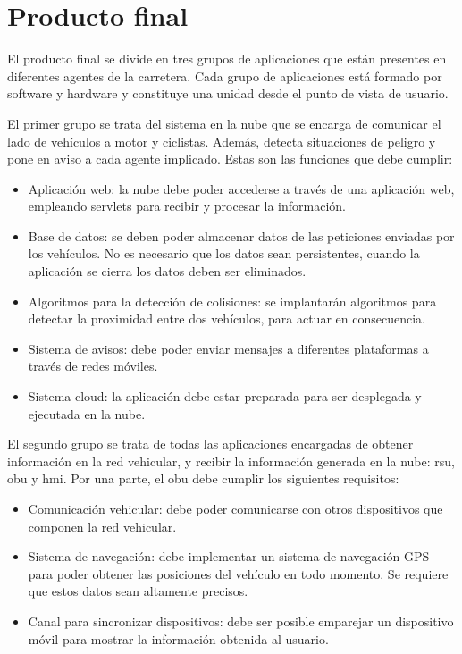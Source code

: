 \chapter{Producto final}
El producto final se divide en tres grupos de aplicaciones que están presentes en diferentes agentes de la carretera. Cada grupo de aplicaciones está formado por software y hardware y constituye una unidad desde el punto de vista de usuario.

El primer grupo se trata del sistema en la nube que se encarga de comunicar el lado de vehículos a motor y ciclistas. Además, detecta situaciones de peligro y pone en aviso a cada agente implicado. Estas son las funciones que debe cumplir:
\begin{itemize}
	\item Aplicación web: la nube debe poder accederse a través de una aplicación web, empleando servlets para recibir y procesar la información.
	
	\item Base de datos: se deben poder almacenar datos de las peticiones enviadas por los vehículos. No es necesario que los datos sean persistentes, cuando la aplicación	se cierra los datos deben ser eliminados.
	
	\item Algoritmos para la detección de colisiones: se implantarán algoritmos para detectar la proximidad entre dos vehículos, para actuar en consecuencia.
	
	\item Sistema de avisos: debe poder enviar mensajes a diferentes plataformas a través de redes móviles.
	
	\item Sistema cloud: la aplicación debe estar preparada para ser desplegada y ejecutada en la nube.
\end{itemize}

El segundo grupo se trata de todas las aplicaciones encargadas de obtener información en la red vehicular, y recibir la información generada en la nube: \gls{rsu}, \gls{obu} y \gls{hmi}. Por una parte, el \gls{obu} debe cumplir los siguientes requisitos:
\begin{itemize}
	\item Comunicación vehicular: debe poder comunicarse con otros dispositivos que	componen la red vehicular.
	
	\item Sistema de navegación: debe implementar un sistema de navegación GPS para	poder obtener las posiciones del vehículo en todo momento. Se requiere que estos datos sean altamente precisos.
	
	\item Canal para sincronizar dispositivos: debe ser posible emparejar un dispositivo móvil para mostrar la información obtenida al usuario.
\end{itemize}

